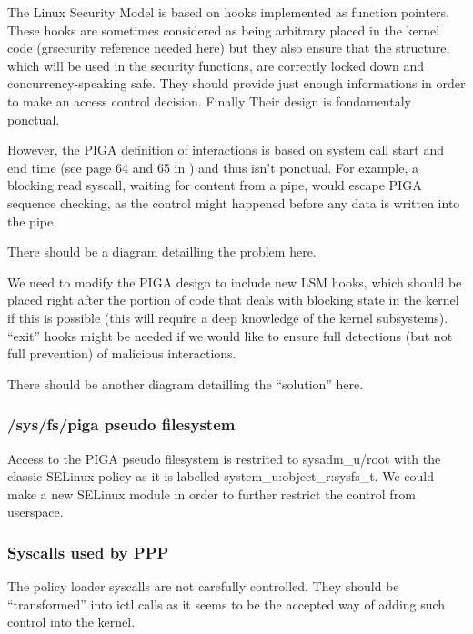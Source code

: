 \documentclass[pdftex,a4paper,titlepage,11pt]{article}
\begin{document}
The Linux Security Model is based on hooks implemented as function pointers.
These hooks are sometimes considered as being arbitrary placed in the kernel
code (grsecurity reference needed here) but they also ensure that the structure,
which will be used in the security functions, are correctly locked down and
concurrency-speaking safe. They should provide just enough informations in order
to make an access control decision. Finally Their design is fondamentaly
ponctual.

\bigskip

However, the PIGA definition of interactions is based on system call start and
end time (see page 64 and 65 in \cite{THESEBRIFFAUT}) and thus isn't ponctual.
For example, a blocking read syscall, waiting for content from a pipe, would
escape PIGA sequence checking, as the control might happened before any data is
written into the pipe.

\bigskip

There should be a diagram detailling the problem here.

\bigskip

We need to modify the PIGA design to include new LSM hooks, which should be
placed right after the portion of code that deals with blocking state in the
kernel if this is possible (this will require a deep knowledge of the kernel
subsystems). ``exit'' hooks might be needed if we would like to ensure full
detections (but not full prevention) of malicious interactions.

\bigskip

There should be another diagram detailling the ``solution'' here.

\subsubsection{/sys/fs/piga pseudo filesystem}

Access to the PIGA pseudo filesystem is restrited to sysadm\_u/root with the
classic SELinux policy as it is labelled system\_u:object\_r:sysfs\_t. We could
make a new SELinux module in order to further restrict the control from
userspace.

\subsubsection{Syscalls used by PPP}

The policy loader syscalls are not carefully controlled. They should be
``transformed'' into ictl calls as it seems to be the accepted way of adding
such control into the kernel.
\end{document}
